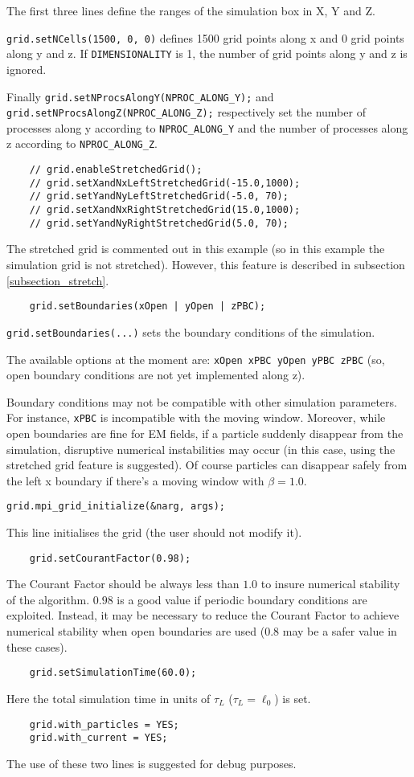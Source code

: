 \documentclass[11pt,a4paper]{report}
\begin{document}
The first three lines define the ranges of the simulation box in X, Y and Z.

\verb+grid.setNCells(1500, 0, 0)+ defines 1500 grid points along x and 0 grid points along y and z. If \verb+DIMENSIONALITY+ is 1, the number of grid points along y and z is ignored.

Finally \verb+grid.setNProcsAlongY(NPROC_ALONG_Y);+ and \verb+grid.setNProcsAlongZ(NPROC_ALONG_Z);+ respectively set the number of processes along y according to \verb+NPROC_ALONG_Y+ and the number of processes along z according to \verb+NPROC_ALONG_Z+.
\begin{lstlisting}
	// grid.enableStretchedGrid();
	// grid.setXandNxLeftStretchedGrid(-15.0,1000);
	// grid.setYandNyLeftStretchedGrid(-5.0, 70);
	// grid.setXandNxRightStretchedGrid(15.0,1000);
	// grid.setYandNyRightStretchedGrid(5.0, 70);
\end{lstlisting}
The stretched grid is commented out in this example (so in this example the simulation grid is not stretched). However, this feature is described in subsection \ref{subsection_stretch}.
\begin{lstlisting}
	grid.setBoundaries(xOpen | yOpen | zPBC);
\end{lstlisting}
\verb+grid.setBoundaries(...)+ sets the boundary conditions of the simulation.

The available options at the moment are: \verb+xOpen xPBC yOpen yPBC zPBC+ 
(so, open boundary conditions are not yet implemented along z).

Boundary conditions may not be compatible with other simulation parameters. For instance, \verb+xPBC+ is incompatible with the moving window. Moreover, while open boundaries are fine for EM fields, if a particle suddenly disappear from the simulation, disruptive numerical instabilities may occur (in this case, using the stretched grid feature is suggested). Of course particles can disappear safely from the left x boundary if there's a moving window with $\beta = 1.0$.

\begin{lstlisting}[backgroundcolor=\color{no_modify}]
	grid.mpi_grid_initialize(&narg, args);
\end{lstlisting}
This line initialises the grid (the user should not modify it). 
\begin{lstlisting}
	grid.setCourantFactor(0.98);
\end{lstlisting}
The Courant Factor should be always less than $1.0$ to insure numerical stability of the algorithm. $0.98$ is a good value if periodic boundary conditions are exploited. Instead, it may be necessary to reduce the Courant Factor to achieve numerical stability when open boundaries are used ($0.8$ may be a safer value in these cases).
\begin{lstlisting}
	grid.setSimulationTime(60.0);
\end{lstlisting}
Here the total simulation time in units of $\tau_L$ ($\tau_L=\ell_0$) is set.
\begin{lstlisting}
	grid.with_particles = YES;
	grid.with_current = YES;
\end{lstlisting}
The use of these two lines is suggested for debug purposes.
\end{document}
